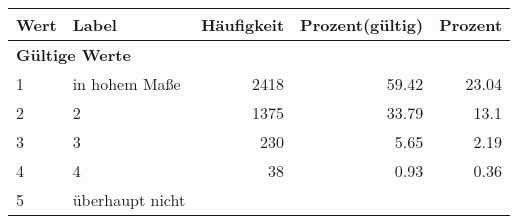      \begin{longtable}{lXrrr}
     \toprule
     \textbf{Wert} & \textbf{Label} & \textbf{Häufigkeit} & \textbf{Prozent(gültig)} & \textbf{Prozent} \\
     \endhead
     \midrule
     \multicolumn{5}{l}{\textbf{Gültige Werte}}\\

     1 &
     \multicolumn{1}{X}{ in hohem Maße   } &


       \num{2418} &
       \num[round-mode=places,round-precision=2]{59,42} &
         \num[round-mode=places,round-precision=2]{23,04} \\

     2 &
     \multicolumn{1}{X}{ 2   } &


       \num{1375} &
       \num[round-mode=places,round-precision=2]{33,79} &
         \num[round-mode=places,round-precision=2]{13,1} \\

     3 &
     \multicolumn{1}{X}{ 3   } &


       \num{230} &
       \num[round-mode=places,round-precision=2]{5,65} &
         \num[round-mode=places,round-precision=2]{2,19} \\

     4 &
     \multicolumn{1}{X}{ 4   } &


       \num{38} &
       \num[round-mode=places,round-precision=2]{0,93} &
         \num[round-mode=places,round-precision=2]{0,36} \\

     5 &
     \multicolumn{1}{X}{ überhaupt nicht   } &



\end{longtable}
